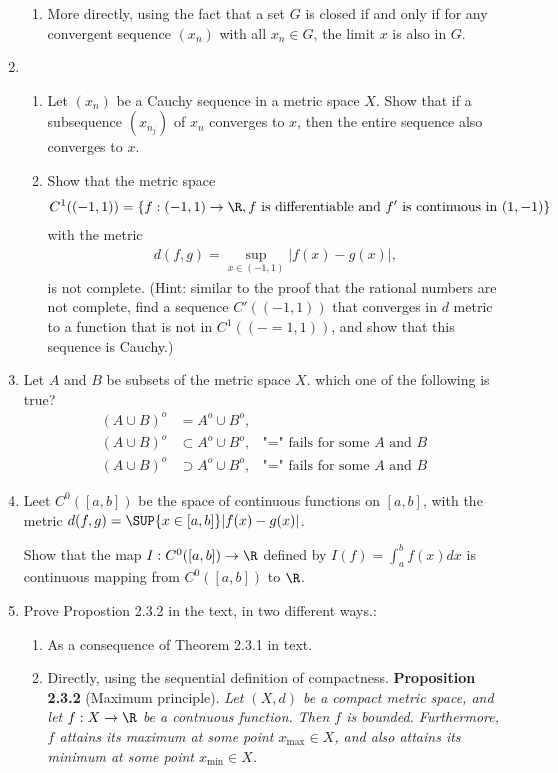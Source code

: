 \documentclass[10pt,a4paper]{report}
\begin{document}
\begin{enumerate}[label=\Roman*.]
\begin{enumerate}[label=(\alph*)]
		\item More directly, using the fact that a set $G$ is closed if and only if for any convergent sequence $(x_n)$ with all $x_n \in G$, the limit $x$ is also in $G$.
	\end{enumerate}
	
	\item\begin{enumerate}[label=(\alph*)]
		\item Let $(x_n)$ be a Cauchy sequence in a metric space $X$.  Show that if a subsequence $(x_{n_j})$ of $x_n$ converges to $x$, then the entire sequence also converges to $x$.
		\item Show that the metric space
		\begin{align*}
			C^1((-1,1))=\{f:(-1,1)\to\R, f \text{ is differentiable and }f'\text{ is continuous in }(1,-1)\}
		\end{align*}with the metric
		\begin{align*}
			d(f,g) = \sup_{x\in (-1,1)} |f(x)-g(x)|,
		\end{align*}is not complete.  (Hint: similar to the proof that the rational numbers are not complete, find a sequence $C'((-1,1))$ that converges in $d$ metric to a function that is not in $C^1((-=1,1))$, and show that this sequence is Cauchy.)
	\end{enumerate}
	
	\item Let $A$ and $B$ be subsets of the metric space $X$.  which one of the following is true?
	\begin{align}
		(A\cup B)^o &= A^o \cup B^o, &\label{eq:eq1}\tag{2.1}\\
		(A \cup B)^o &\subset A^o\cup B^o, & \text{"=" fails for some $A$ and $B$} \label{eq:eq1}\tag{2.2} \\
		(A\cup B)^o &\supset A^o\cup B^o, &\text{"=" fails for some $A$ and $B$}\label{eq:eq1}\tag{2.3}
	\end{align}
	
	\item Leet $C^0([a,b])$ be the space of continuous functions on $[a,b]$, with the metric $d(f,g) = \SUP{x\in [a,b]}|f(x)-g(x)|$.
	
	Show that the map $I: C^0([a,b]) \to \R$ defined by $I(f)=\int_a^b f(x) dx$ is continuous mapping from $C^0([a,b])$ to $\R$.
	
	\item Prove Propostion 2.3.2 in the text, in two different ways.:
	\begin{enumerate}[label=\alph*)]
		\item As a consequence of Theorem 2.3.1 in text.
		\item Directly, using the sequential definition of compactness.
		\textbf{Proposition 2.3.2} (Maximum principle). \textit{ Let $(X,d)$ be a compact metric space, and let $f:X \to \R$ be a contnuous function.  Then $f$ is bounded.  Furthermore, $f$ attains its maximum at some point $x_{\max} \in X$, and also attains its minimum at some point $x_{\min} \in X$. }
	\end{enumerate}
	

\end{enumerate}
\end{document}
